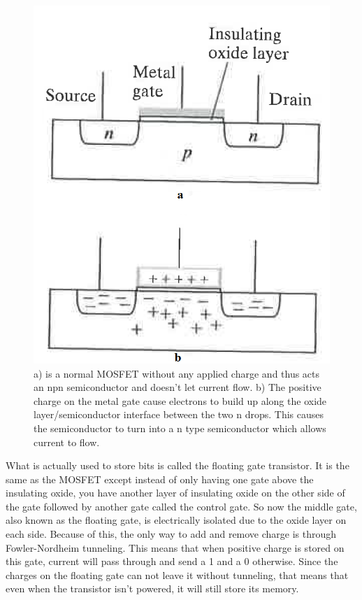 \documentclass[ notitlepage, numerical, 11pt]{revtex4-1} %
\begin{document}
\begin{figure}[H]
\centerline{\includegraphics[scale=.45]{mosfet.png}}
\caption{ a) is a normal MOSFET without any applied charge and thus acts an npn semiconductor and doesn't let current flow. b) The positive charge on the metal gate cause electrons to build up along the oxide layer/semiconductor interface between the two n drops. This causes the semiconductor to turn into a n type semiconductor which allows current to flow.}
\label{mosfet}
\end{figure}

What is actually used to store bits is called the floating gate transistor. It is the same as the MOSFET except instead of only having one gate above the insulating oxide, you have another layer of insulating oxide on the other side of the gate followed by another gate called the control gate. So now the middle gate, also known as the floating gate, is electrically isolated due to the oxide layer on each side. Because of this, the only way to add and remove charge is through Fowler-Nordheim tunneling.  This means that when positive charge is stored on this gate, current will pass through and send a 1 and a 0 otherwise. Since the charges on the floating gate can not leave it without tunneling, that means that even when the transistor isn't powered, it will still store its memory. 
\end{document}
